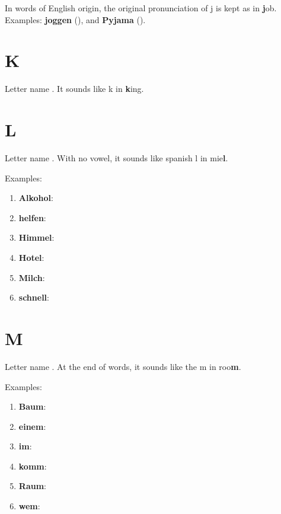 In words of English origin, the original pronunciation of j is kept as in \textbf{j}ob. Examples: \textbf{joggen} (\textipa{["{\textdyoghlig}Og@n]}), and \textbf{Pyjama} (\textipa{[py"{\textdyoghlig}a:ma]}).

\section*{K}

Letter name \textipa{[ka:]}. It sounds like k in \textbf{k}ing.

\section*{L}

Letter name \textipa{[El]}. With no vowel, it sounds like spanish l in mie\textbf{l}.

Examples:
\begin{enumerate}
    \item \textbf{Alkohol}: \textipa{["alkoho:l]}
    \item \textbf{helfen}: \textipa{["hElf@n]}
    \item \textbf{Himmel}: \textipa{["hIm@l]}
    \item \textbf{Hotel}: \textipa{[ho"tEl]}
    \item \textbf{Milch}: \textipa{[mil\c{c}]}
    \item \textbf{schnell}: \textipa{[SnEl]}
\end{enumerate}

\section*{M}

Letter name \textipa{[Em]}. At the end of words, it sounds like the m in roo\textbf{m}.

Examples:
\begin{enumerate}
    \item \textbf{Baum}: \textipa{[baUm]}
    \item \textbf{einem}: \textipa{["aIn@m]}
    \item \textbf{im}: \textipa{[Im]}
    \item \textbf{komm}: \textipa{[kOm]}
    \item \textbf{Raum}: \textipa{[raUm]}
    \item \textbf{wem}: \textipa{[ve:m]}
\end{enumerate}

